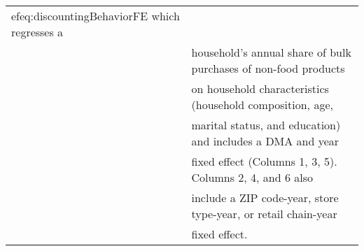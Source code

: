 \begin{table}[!htbp]
\begin{tabular}{@{\extracolsep{5pt}}lccccc}
{ef{eq:discountingBehaviorFE} which regresses a } \\ 
 & \multicolumn{5}{l}{household's annual share of bulk purchases of non-food products } \\ 
 & \multicolumn{5}{l}{on household characteristics (household composition, age, } \\ 
 & \multicolumn{5}{l}{marital status, and education) and includes a DMA and year } \\ 
 & \multicolumn{5}{l}{fixed effect (Columns 1, 3, 5). Columns 2, 4, and 6 also } \\ 
 & \multicolumn{5}{l}{include a ZIP code-year, store type-year, or retail chain-year } \\ 
 & \multicolumn{5}{l}{fixed effect.} \\ 
\end{tabular} 
\end{table} 
